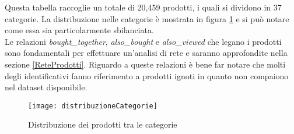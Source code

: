 Questa tabella raccoglie un totale di 20,459 prodotti, i quali si dividono in 37 categorie. La distribuzione nelle categorie è mostrata in figura \ref{fig:distribuzioneCategorie} e si può notare come essa sia particolarmente sbilanciata. \\
Le relazioni \textit{bought\_together}, \textit{also\_bought} e \textit{also\_viewed} che legano i prodotti sono fondamentali per effettuare un'analisi di rete e saranno approfondite nella sezione \ref{ReteProdotti}. Riguardo a queste relazioni è bene far notare che molti degli identificativi fanno riferimento a prodotti ignoti in quanto non compaiono nel dataset disponibile.

\begin{figure}[H]
    \texttt{[image: distribuzioneCategorie]}\centering
    \caption{Distribuzione dei prodotti tra le categorie}\label{fig:distribuzioneCategorie}
\end{figure}

